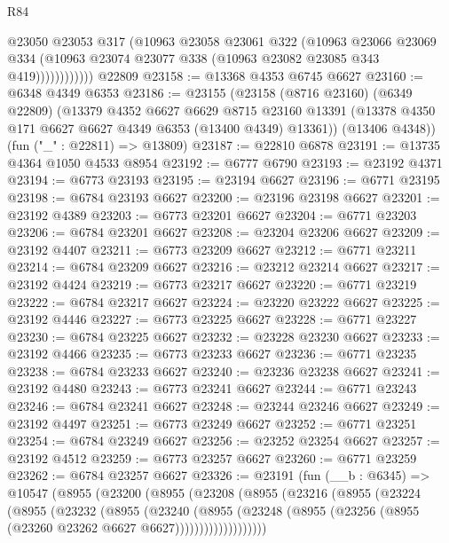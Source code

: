 \begin{lexlean}{R84}
\begin{coremodule}
                    @23050
                    @23053
                    @317
                    (@10963
                      @23058
                      @23061
                      @322
                      (@10963
                        @23066
                        @23069
                        @334
                        (@10963 @23074 @23077 @338 (@10963 @23082 @23085 @343 @419))))))))))))
    @22809
@23158 := @13368 @4353 @6745 @6627
@23160 := @6348 @4349 @6353
@23186 := @23155
    (@23158
      (@8716 @23160)
      (@6349 @22809)
      (@13379
        @4352
        @6627
        @6629
        @8715
        @23160
        @13391
        (@13378 @4350 @171 @6627 @6627 @4349 @6353 (@13400 @4349) @13361))
      (@13406 @4348))
    (fun ("_" : @22811) => @13809)
@23187 := @22810 @6878
@23191 := @13735 @4364 @1050 @4533 @8954
@23192 := @6777 @6790
@23193 := @23192 @4371
@23194 := @6773 @23193
@23195 := @23194 @6627
@23196 := @6771 @23195
@23198 := @6784 @23193 @6627
@23200 := @23196 @23198 @6627
@23201 := @23192 @4389
@23203 := @6773 @23201 @6627
@23204 := @6771 @23203
@23206 := @6784 @23201 @6627
@23208 := @23204 @23206 @6627
@23209 := @23192 @4407
@23211 := @6773 @23209 @6627
@23212 := @6771 @23211
@23214 := @6784 @23209 @6627
@23216 := @23212 @23214 @6627
@23217 := @23192 @4424
@23219 := @6773 @23217 @6627
@23220 := @6771 @23219
@23222 := @6784 @23217 @6627
@23224 := @23220 @23222 @6627
@23225 := @23192 @4446
@23227 := @6773 @23225 @6627
@23228 := @6771 @23227
@23230 := @6784 @23225 @6627
@23232 := @23228 @23230 @6627
@23233 := @23192 @4466
@23235 := @6773 @23233 @6627
@23236 := @6771 @23235
@23238 := @6784 @23233 @6627
@23240 := @23236 @23238 @6627
@23241 := @23192 @4480
@23243 := @6773 @23241 @6627
@23244 := @6771 @23243
@23246 := @6784 @23241 @6627
@23248 := @23244 @23246 @6627
@23249 := @23192 @4497
@23251 := @6773 @23249 @6627
@23252 := @6771 @23251
@23254 := @6784 @23249 @6627
@23256 := @23252 @23254 @6627
@23257 := @23192 @4512
@23259 := @6773 @23257 @6627
@23260 := @6771 @23259
@23262 := @6784 @23257 @6627
@23326 := @23191
    (fun (__b : @6345) =>
    @10547
      (@8955
        (@23200
          (@8955
            (@23208
              (@8955
                (@23216
                  (@8955
                    (@23224
                      (@8955
                        (@23232
                          (@8955
                            (@23240
                              (@8955
                                (@23248
                                  (@8955
                                    (@23256 (@8955 (@23260 @23262 @6627 @6627)))))))))))))))))))

\end{coremodule}
\end{lexlean}
